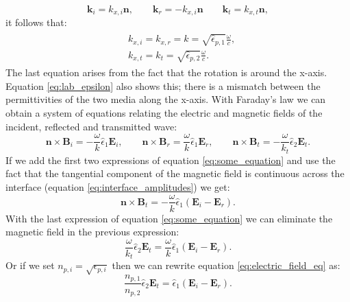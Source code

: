 \begin{equation}
    \bm{k}_i = k_{x,i} \bm{n}, \qquad \bm{k}_r = -k_{x,i} \bm{n} \qquad \bm{k}_t = k_{x,t} \bm{n},
\end{equation}
it follows that:
\begin{align}
\begin{split}
    &k_{x,i} = k_{x,r} = k = \sqrt{\hat{\epsilon}_{p,1}}\frac{\omega}{c}, \\
    &k_{x,t} = k_t = \sqrt{\hat{\epsilon}_{p,2}}\frac{\omega}{c}.
\end{split}
\end{align}
The last equation arises from the fact that the rotation is around the x-axis. Equation \ref{eq:lab_epsilon} also shows this; there is a mismatch between the permittivities of the two media along the x-axis. With Faraday's law we can obtain a system of equations relating the electric and magnetic fields of the incident, reflected and transmitted wave:
\begin{equation}
    \label{eq:some_equation}
    \bm{n} \times \bm{B}_i = -\frac{\omega}{k} \hat{\epsilon}_1 \bm{E}_i, \qquad
    \bm{n} \times \bm{B}_r = \frac{\omega}{k} \hat{\epsilon}_1 \bm{E}_r, \qquad
    \bm{n} \times \bm{B}_t = -\frac{\omega}{k_t} \hat{\epsilon}_2 \bm{E}_t.
\end{equation}
If we add the first two expressions of equation \ref{eq:some_equation} and use the fact that the tangential component of the magnetic field is continuous across the interface (equation \ref{eq:interface_amplitudes}) we get:
\begin{equation}
    \bm{n} \times \bm{B}_t = -\frac{\omega}{k}\hat{\epsilon}_1(\bm{E}_{i}-\bm{E}_{r}).
\end{equation}
With the last expression of equation \ref{eq:some_equation} we can eliminate the magnetic field in the previous expression:
\begin{equation}
    \label{eq:electric_field_eq}
    \frac{\omega}{k_t}\hat{\epsilon}_2 \bm{E}_t = \frac{\omega}{k}\hat{\epsilon}_1(\bm{E}_{i}-\bm{E}_{r}).
\end{equation}
Or if we set $n_{p,i} = \sqrt{\epsilon_{p,i}}$ then we can rewrite equation \ref{eq:electric_field_eq} as:
\begin{equation}
    \label{eq:electric_field_eq_rew}
    \frac{n_{p,1}}{n_{p,2}}\hat{\epsilon}_2 \bm{E}_t = \hat{\epsilon}_1(\bm{E}_{i}-\bm{E}_{r}).
\end{equation}

